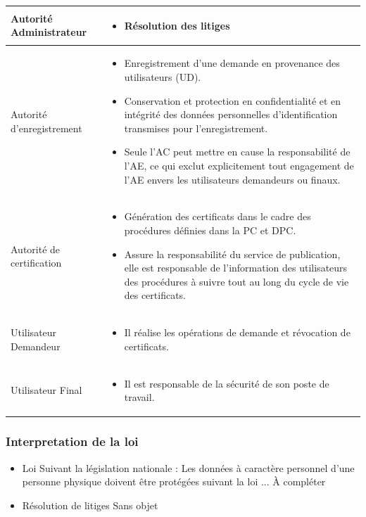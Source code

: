 \documentclass[a4paper,11pt,french]{article}
\begin{document}
\begin{tabular}{|l|p{10cm}|}
  \hline
  Autorité Administrateur &  
  \begin{itemize}
  \item Résolution des litiges
   \end{itemize}

 \\
  \hline
  Autorité d'enregistrement & 
  \begin{itemize}
\item Enregistrement d’une demande en provenance des utilisateurs (UD).
\item Conservation et protection en confidentialité et en intégrité des données personnelles d’identification transmises pour l’enregistrement.
\item Seule l'AC peut mettre en cause la responsabilité de l'AE, ce qui exclut explicitement tout engagement de l'AE envers les utilisateurs demandeurs ou finaux.

  \end{itemize}
  \\
  \hline
  Autorité de certification &
  \begin{itemize}
\item Génération des certificats dans le cadre des procédures définies dans la PC et DPC.
\item Assure la responsabilité du service de publication, elle est responsable de l'information des utilisateurs des procédures à suivre tout au long du cycle de vie des certificats.


  \end{itemize}
 \\
 \hline
 Utilisateur Demandeur &
 \begin{itemize}
\item Il réalise les opérations de demande et révocation de certificats.
 
 \end{itemize} 
  
 \\
 \hline
 Utilisateur Final &
 \begin{itemize}
\item Il est responsable de la sécurité de son poste de travail.
 
 \end{itemize}
\\
\hline
  
\end{tabular}             

\subsubsection{Interpretation de la loi}
\begin{itemize}
\item Loi
Suivant la législation nationale :
Les données à caractère personnel d’une personne physique doivent être protégées suivant la loi ... À compléter
\item Résolution de litiges
Sans objet
\end{itemize}
\end{document}
